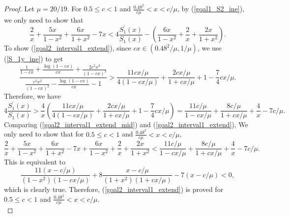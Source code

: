 ﻿\documentclass[10pt]{article}
\begin{document}
\begin{proof}
Let $\mu = 20/19$. For $0.5\leq c<1$ and $\frac{0.48^2}{c\mu}<x<c/\mu$, by (\ref{goal1_S2_ine}), we only need to show that
\begin{equation}
    \frac{2}{x}+\frac{5x}{1-x^2}+\frac{6x}{1+x^2}-7x<4\frac{S_1^{'}(x)}{S_1(x)}-\left(\frac{6x}{1-x^2}+\frac{2}{x}+\frac{2x}{1+x^2}\right). \label{goal2_interval1_extend}
\end{equation}
To show (\ref{goal2_interval1_extend}), since $cx\in(0.48^2/\mu, 1/\mu)$, we use (\ref{S_1y_ine}) to get
\begin{equation}
    \frac{\frac{1}{1-cx}+\frac{\log(1-cx)}{cx}+\frac{2c^2x^2}{(1-cx)^3}}{\frac{c^2x^2}{(1-cx)^{2}}-\frac{\log(1-cx)}{cx}-1}>\frac{11cx/\mu}{4(1-cx/\mu)}+\frac{2cx/\mu}{1+cx/\mu}+1-\frac{7}{4}cx/\mu.
\end{equation}
Therefore, we have
\begin{equation}
    4\frac{S_1^{'}(x)}{S_1(x)}>\frac{4}{x}\left(\frac{11cx/\mu}{4(1-cx/\mu)}+\frac{2cx/\mu}{1+cx/\mu}+1-\frac{7}{4}cx/\mu\right) = \frac{11c/\mu}{1-cx/\mu}+\frac{8c/\mu}{1+cx/\mu}+\frac{4}{x}-7c/\mu.
\label{goal2_interval1_extend_mid}
\end{equation}
Comparing (\ref{goal2_interval1_extend_mid}) and (\ref{goal2_interval1_extend}),
We only need to show that for $0.5\leq c<1$ and $\frac{0.48^2}{c\mu}<x<c/\mu$,
$$\frac{2}{x}+\frac{5x}{1-x^2}+\frac{6x}{1+x^2}-7x+\frac{6x}{1-x^2}+\frac{2}{x}+\frac{2x}{1+x^2}<\frac{11c/\mu}{1-cx/\mu}+\frac{8c/\mu}{1+cx/\mu}+\frac{4}{x}-7c/\mu.
$$
This is equivalent to
$$\frac{11(x-c/\mu)}{(1-x^2)(1-cx/\mu)}+8\frac{x-c/\mu}{(1+x^2)(1+cx/\mu)}-7(x-c/\mu)<0,
$$
which is clearly true. Therefore, (\ref{goal2_interval1_extend}) is proved for $0.5\leq c<1$ and $\frac{0.48^2}{c\mu}<x<c/\mu$.\\


\end{proof}
\end{document}
